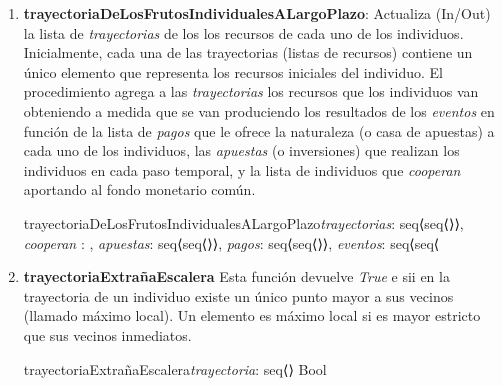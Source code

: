 \documentclass[10pt,a4paper]{article}
\begin{document}
\begin{enumerate}
    \item \textbf{trayectoriaDeLosFrutosIndividualesALargoPlazo}: Actualiza (In/Out) la lista de \textit{trayectorias} de los los recursos de cada uno de los individuos. Inicialmente, cada una de las trayectorias (listas de recursos) contiene un único elemento que representa los recursos iniciales del individuo. El procedimiento agrega a las \textit{trayectorias} los recursos que los individuos van obteniendo a medida que se van produciendo los resultados de los \textit{eventos} en función de la lista de \textit{pagos} que le ofrece la naturaleza (o casa de apuestas) a cada uno de los individuos, las \textit{apuestas} (o inversiones) que realizan los individuos en cada paso temporal, y la lista de individuos que \textit{cooperan} aportando al fondo monetario común.
    
    \begin{proc}{trayectoriaDeLosFrutosIndividualesALargoPlazo}{\Inout \textit{trayectorias}:
        seq⟨seq⟨\real⟩⟩, \In \textit{cooperan} : , \In \textit{apuestas}: seq⟨seq⟨\real⟩⟩, \In \textit{pagos}: seq⟨seq⟨\real⟩⟩, 
        \In \textit{eventos}: seq⟨seq⟨\nat}
    {}
        \requiere{}

        \asegura{}

    \end{proc}

    \item \textbf{trayectoriaExtrañaEscalera} Esta función devuelve \textit{True} e sii en la trayectoria de un individuo existe un único punto mayor a sus vecinos (llamado máximo local). Un elemento es máximo local si es mayor estricto que sus vecinos inmediatos.
    
    \begin{proc}{trayectoriaExtrañaEscalera}{\In \textit{trayectoria}: seq⟨\real⟩} {Bool}



            
            
            
            

    \end{proc}

\end{enumerate}
\end{document}
